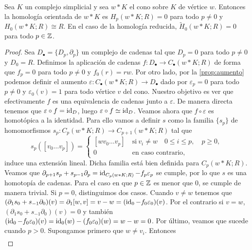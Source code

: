 \begin{proposicion}
	\label{prop:char-homol-cono} Sea $K$ un complejo simplicial y sea $w \ast K$ el
	cono sobre $K$ de vértice $w$. Entonces la homología orientada de $w \ast K$
	es $H_{p}(w \ast K;R) = 0$ para todo $p \neq 0$ y $H_{0}(w \ast K;R) \cong R$.
	En el caso de la homología reducida, $\widetilde{H}_{0}(w \ast K;R) = 0$ para
	todo $p \in \mathbb{Z}$.
\end{proposicion}
\begin{proof}
	Sea $D_{\bullet}= \{D_{p}, \partial_{p}\}$ un complejo de cadenas tal que $D_{p}
	= 0$ para todo $p \neq 0$ y $D_{0}= R$. Definimos la aplicación de cadenas
	$f: D_{\bullet}\to C_{\bullet}(w \ast K;R)$ de forma que $f_{p}= 0$ para todo
	$p \neq 0$ y $f_{0}(r)=rw$. Por otro lado, por la \autoref{prop:aumento}
	podemos definir el aumento
	$\varepsilon: C_{\bullet}(w \ast K;R) \to D_{\bullet}$ dado por
	$\varepsilon_{p}=0$ para todo $p \neq 0$ y $\varepsilon_{0}(v) = 1$ para todo
	vértice $v$ del cono. Nuestro objetivo es ver que efectivamente $f$ es una equivalencia
	de cadenas junto a $\varepsilon$. De manera directa tenemos que
	$\varepsilon \circ f = \operatorname{id}_{D}$, luego $\varepsilon \circ f \simeq \operatorname{id}_{D}$.
	Veamos ahora que $f \circ \varepsilon$ es homotópica a la identidad. Para ello
	vamos a definir $s$ como la familia $\{s_{p}\}$ de homomorfismos $s_{p}: C_{p}(
	w \ast K;R) \to C_{p+1}(w \ast K;R)$ tal que
	\[
	s_{p}([v_{0}\ldots v_{p}]) =
	\begin{cases}
		[wv_{0}\ldots v_{p}] \  & \text{si}\ v_{i}\neq w \quad 0 \leq i \leq p,\quad p \geq 0, \\
		0 \                     & \text{en caso contrario},
	\end{cases}
	\]
	induce una extensión lineal. Dicha familia está bien definida para
	$C_{p}(w \ast K;R)$. Veamos que $\partial_{p+1}s_{p}+ s_{p-1}\partial_{p}= \operatorname{id}_{C_p(w
		\ast K;R)}- f_{p}\varepsilon_{p}$ se cumple, por lo que $s$ es una homotopía
	de cadenas. Para el caso en que $p \in \mathbb{Z}$ es menor que $0$, se cumple de
	manera trivial. Si $p = 0$, distinguimos dos casos. Cuando $v \neq w$ tenemos que
	$(\partial_{1}s_{0}+s_{-1}\partial_{0})(v) = \partial_{1}[w,v] = v-w = (\operatorname{id}_{0}
	- f_{0}\varepsilon_{0})(v)$. Por el contrario si $v = w$, $(\partial_{1}s_{0}+s
	_{-1}\partial_{0}) (v) = 0$ y también $(\operatorname{id}_{0}- f_{0}\varepsilon_{0})(v) = \operatorname{id}
	_{0}(w) - (f_{0}\varepsilon_{0})(w) = w - w = 0$. Por último, veamos que sucede
	cuando $p > 0$. Supongamos primero que $w \neq v_{i}$. Entonces
	\begin{gather*}

\end{gather*}
\end{proof}
